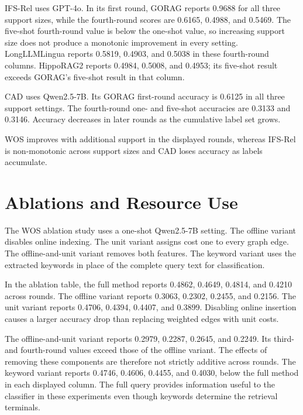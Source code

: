 IFS-Rel uses GPT-4o. In its first round, GORAG reports 0.9688 for all three support sizes, while the fourth-round scores are 0.6165, 0.4988, and 0.5469. The five-shot fourth-round value is below the one-shot value, so increasing support size does not produce a monotonic improvement in every setting. LongLLMLingua reports 0.5819, 0.4903, and 0.5038 in these fourth-round columns. HippoRAG2 reports 0.4984, 0.5008, and 0.4953; its five-shot result exceeds GORAG's five-shot result in that column.

CAD uses Qwen2.5-7B. Its GORAG first-round accuracy is 0.6125 in all three support settings. The fourth-round one- and five-shot accuracies are 0.3133 and 0.3146. Accuracy decreases in later rounds as the cumulative label set grows.

WOS improves with additional support in the displayed rounds, whereas IFS-Rel is non-monotonic across support sizes and CAD loses accuracy as labels accumulate.

\section{Ablations and Resource Use}
\label{sec:gorag:ablations}

The WOS ablation study uses a one-shot Qwen2.5-7B setting. The offline variant disables online indexing. The unit variant assigns cost one to every graph edge. The offline-and-unit variant removes both features. The keyword variant uses the extracted keywords in place of the complete query text for classification.



In the ablation table, the full method reports 0.4862, 0.4649, 0.4814, and 0.4210 across rounds. The offline variant reports 0.3063, 0.2302, 0.2455, and 0.2156. The unit variant reports 0.4706, 0.4394, 0.4407, and 0.3899. Disabling online insertion causes a larger accuracy drop than replacing weighted edges with unit costs.

The offline-and-unit variant reports 0.2979, 0.2287, 0.2645, and 0.2249. Its third- and fourth-round values exceed those of the offline variant. The effects of removing these components are therefore not strictly additive across rounds. The keyword variant reports 0.4746, 0.4606, 0.4455, and 0.4030, below the full method in each displayed column. The full query provides information useful to the classifier in these experiments even though keywords determine the retrieval terminals.

